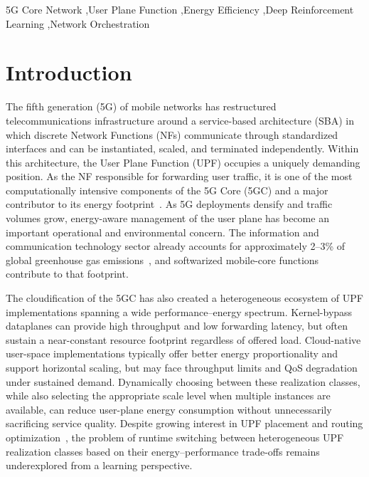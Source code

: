 \documentclass[a4paper,fleqn]{cas-sc}
\begin{document}

\begin{keywords}
5G Core Network \sep User Plane Function \sep Energy Efficiency \sep Deep Reinforcement Learning \sep Network Orchestration
\end{keywords}

\maketitle


\section{Introduction}
\label{intro}

The fifth generation (5G) of mobile networks has restructured telecommunications infrastructure around a service-based architecture (SBA) in which discrete Network Functions (NFs) communicate through standardized interfaces and can be instantiated, scaled, and terminated independently. Within this architecture, the User Plane Function (UPF) occupies a uniquely demanding position. As the NF responsible for forwarding user traffic, it is one of the most computationally intensive components of the 5G Core (5GC) and a major contributor to its energy footprint~\cite{bellin2024comnet,chen2024comcom}. As 5G deployments densify and traffic volumes grow, energy-aware management of the user plane has become an important operational and environmental concern. The information and communication technology sector already accounts for approximately 2--3\% of global greenhouse gas emissions~\cite{freitag2021patterns}, and softwarized mobile-core functions contribute to that footprint.

The cloudification of the 5GC has also created a heterogeneous ecosystem of UPF implementations spanning a wide performance--energy spectrum. Kernel-bypass dataplanes can provide high throughput and low forwarding latency, but often sustain a near-constant resource footprint regardless of offered load. Cloud-native user-space implementations typically offer better energy proportionality and support horizontal scaling, but may face throughput limits and QoS degradation under sustained demand. Dynamically choosing between these realization classes, while also selecting the appropriate scale level when multiple instances are available, can reduce user-plane energy consumption without unnecessarily sacrificing service quality. Despite growing interest in UPF placement and routing optimization~\cite{chen2024comcom}, the problem of runtime switching between heterogeneous UPF realization classes based on their energy--performance trade-offs remains underexplored from a learning perspective.
\end{document}
